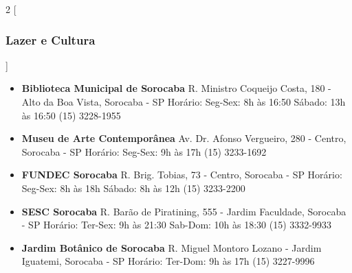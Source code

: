 \begin{multicols}{2}
  [
  \subsubsection{Lazer e Cultura}
  ]
  \begin{itemize}
    \item \textbf{Biblioteca Municipal de Sorocaba}
      \newline R. Ministro Coqueijo Costa, 180 - Alto da Boa Vista, Sorocaba - SP
      \newline Horário: Seg-Sex: 8h às 16:50
      \newline Sábado: 13h às 16:50
      \newline (15) 3228-1955
  \end{itemize}
  \begin{itemize}
    \item \textbf{Museu de Arte Contemporânea}
      \newline Av. Dr. Afonso Vergueiro, 280 - Centro, Sorocaba - SP
      \newline Horário: Seg-Sex: 9h às 17h
      \newline (15) 3233-1692
  \end{itemize}
  \begin{itemize}
    \item \textbf{FUNDEC Sorocaba}
      \newline R. Brig. Tobias, 73 - Centro, Sorocaba - SP
      \newline Horário: Seg-Sex: 8h às 18h
      \newline Sábado: 8h às 12h
      \newline (15) 3233-2200
  \end{itemize}
  \begin{itemize}
    \item \textbf{SESC Sorocaba}
      \newline R. Barão de Piratining, 555 - Jardim Faculdade, Sorocaba - SP
      \newline Horário: Ter-Sex: 9h às 21:30
      \newline Sab-Dom: 10h às 18:30
      \newline (15) 3332-9933
  \end{itemize}
  \begin{itemize}
    \item \textbf{Jardim Botânico de Sorocaba}
      \newline R. Miguel Montoro Lozano - Jardim Iguatemi, Sorocaba - SP
      \newline Horário: Ter-Dom: 9h às 17h
      \newline (15) 3227-9996
  \end{itemize}
\end{multicols}

